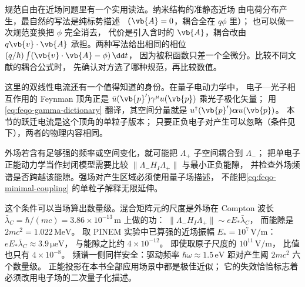 规范自由在近场问题里有一个实用读法。纳米结构的准静态近场
由电荷分布产生，最自然的写法是纯标势描述
（\(\vb{A}=0\)，耦合全在 \(q\phi\) 里）；
也可以做一次规范变换把 \(\phi\) 完全消去，
代价是引入含时的 \(\vb{A}\)，耦合改由
\(q\vb{v}\cdot\vb{A}\) 承担。两种写法给出相同的相位
\((q/\hbar)\int(\vb{v}\cdot\vb{A}-\phi)\,\dd t\)，
因为被积函数只差一个全微分。比较不同文献的耦合公式时，
先确认对方选了哪种规范，再比较数值。

这里的双线性电流还有一个值得知道的身份。在量子电动力学中，
电子—光子相互作用的 Feynman 顶角正是
\(\bar u(\vb{p}')\gamma^\mu u(\vb{p})\) 乘光子极化矢量；
用\cref{eq:feqo-gamma-dictionary} 翻译，其空间分量就是
\(u^\dagger(\vb{p}')\boldsymbol\alpha u(\vb{p})\)。
本节的跃迁电流是这个顶角的单粒子版本；
只要正负电子对产生可以忽略（条件见下），两者的物理内容相同。

外场若含有足够强的频率或空间变化，就可能把
\(\Lambda_+\) 子空间耦合到 \(\Lambda_-\)；
把单电子正能动力学当作封闭模型需要比较
\(\|\Lambda_-H_I\Lambda_+\|\) 与最小正负能隙，
并检查外场频谱是否跨越该能隙。强场对产生区域必须使用量子场描述，
不能把\cref{eq:feqo-minimal-coupling} 的单粒子解释无限延伸。

这个条件可以当场算出数量级。混合矩阵元的尺度是外场在
Compton 波长 \(\bar{\lambda}_C=\hbar/(mc)=3.86\times10^{-13}\,
\si{\metre}\) 上做的功：
\(\|\Lambda_-H_I\Lambda_+\|\sim eE_*\bar{\lambda}_C\)，
而能隙是 \(2mc^2=1.022\,\si{\mega\electronvolt}\)。
取 PINEM 实验中已算强的近场振幅
\(E_*=10^{7}\,\si{\volt\per\metre}\)：
\(eE_*\bar{\lambda}_C\approx3.9\,\si{\micro\electronvolt}\)，
与能隙之比约 \(4\times10^{-12}\)。
即使取原子尺度的 \(10^{11}\,\si{\volt\per\metre}\)，
比值也只有 \(4\times10^{-8}\)。
频谱一侧同样安全：驱动频率
\(\hbar\omega\approx1.5\,\si{\electronvolt}\)
距对产生阈 \(2mc^2\) 六个数量级。
正能投影在本书全部应用场景中都是极佳近似；
它的失效恰恰标志着必须改用电子场的二次量子化描述。



